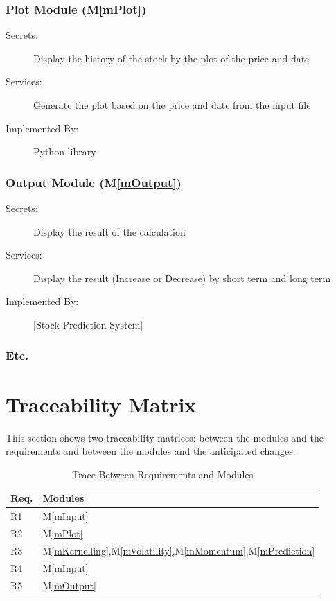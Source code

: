 \documentclass[12pt, titlepage]{article}
\newcommand{\mref}[1]{M\ref{#1}}
\begin{document}
\subsubsection{Plot Module (\mref{mPlot})}
\begin{description}
\item[Secrets:] Display the history of the stock by the plot of the price and date
\item[Services:] Generate the plot based on the price and date from the input file
\item[Implemented By:] Python library
\end{description}

\subsubsection{Output Module (\mref{mOutput})}
\begin{description}
\item[Secrets:] Display the result of the calculation
\item[Services:] Display the result (Increase or Decrease) by short term and long term
\item[Implemented By:] [Stock Prediction System]
\end{description}
\subsubsection{Etc.}

\section{Traceability Matrix} \label{SecTM}

This section shows two traceability matrices: between the modules and the
requirements and between the modules and the anticipated changes.

\begin{table}[H]
\centering
\begin{tabular}{p{} p{}}
\toprule
\textbf{Req.} & \textbf{Modules}\\
\midrule
R1 & \mref{mInput}\\
R2 & \mref{mPlot}\\
R3 & \mref{mKernelling},\mref{mVolatility},\mref{mMomentum},\mref{mPrediction}\\
R4 & \mref{mInput}\\
R5 & \mref{mOutput}\\

\bottomrule
\end{tabular}
\caption{Trace Between Requirements and Modules}
\label{TblRT}
\end{table}
\end{document}
